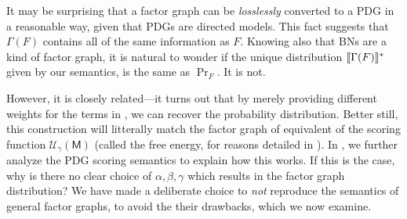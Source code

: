 \documentclass{article}
\DeclarePairedDelimiter{\UD}{\llbracket}{\rrbracket^*}
\newcommand{\sfM}{\mathsf M}
\numberwithin{equation}{section}
\begin{document}

	It may be surprising that a factor graph can be \emph{losslessly} converted to a PDG in a reasonable way, given that PDGs are directed models.
 	This fact suggests that $\Gamma(F)$ contains all of the same information as $F$. Knowing also that BNs are a kind of factor graph, it is natural to wonder if the unique distribution $\UD{\Gamma(F)}$ given by our semantics, is the same as $\Pr_F$.		
		It is not. 
	
	
		
	However, it is closely related---it turns out that by merely providing different weights for the terms in , we can recover the probability distribution. Better still, this construction will litterally match the factor graph of equivalent of the scoring function $\mathcal U_\gamma(\sfM)$ (called the free energy, for reasons detailed in ).
%
		In , we further analyze the PDG scoring semantics to explain how this works.
		If this is the case, why is there no clear choice of $\alpha,\beta,\gamma$ which results in the factor graph distribution?  
		We have made a deliberate choice to \emph{not} reproduce the semantics of general factor graphs, to avoid the their drawbacks, which 
		we now examine.

	
\end{document}
